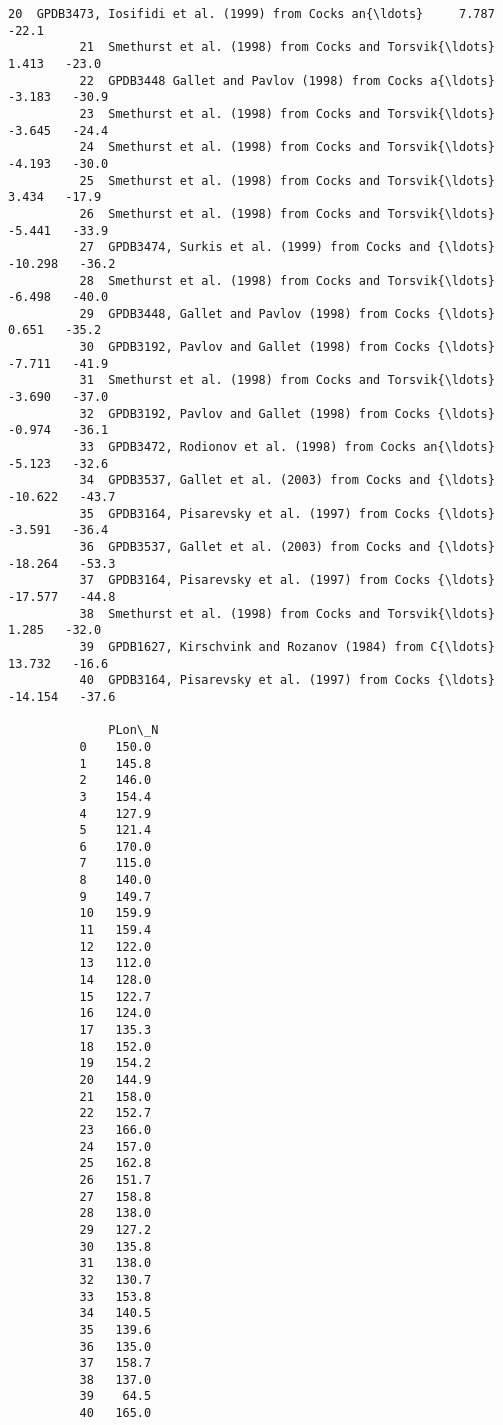 \documentclass[11pt]{article}
\begin{document}
\begin{Verbatim}[commandchars=\\\{\}]
          20  GPDB3473, Iosifidi et al. (1999) from Cocks an{\ldots}     7.787   -22.1   
          21  Smethurst et al. (1998) from Cocks and Torsvik{\ldots}     1.413   -23.0   
          22  GPDB3448 Gallet and Pavlov (1998) from Cocks a{\ldots}    -3.183   -30.9   
          23  Smethurst et al. (1998) from Cocks and Torsvik{\ldots}    -3.645   -24.4   
          24  Smethurst et al. (1998) from Cocks and Torsvik{\ldots}    -4.193   -30.0   
          25  Smethurst et al. (1998) from Cocks and Torsvik{\ldots}     3.434   -17.9   
          26  Smethurst et al. (1998) from Cocks and Torsvik{\ldots}    -5.441   -33.9   
          27  GPDB3474, Surkis et al. (1999) from Cocks and {\ldots}   -10.298   -36.2   
          28  Smethurst et al. (1998) from Cocks and Torsvik{\ldots}    -6.498   -40.0   
          29  GPDB3448, Gallet and Pavlov (1998) from Cocks {\ldots}     0.651   -35.2   
          30  GPDB3192, Pavlov and Gallet (1998) from Cocks {\ldots}    -7.711   -41.9   
          31  Smethurst et al. (1998) from Cocks and Torsvik{\ldots}    -3.690   -37.0   
          32  GPDB3192, Pavlov and Gallet (1998) from Cocks {\ldots}    -0.974   -36.1   
          33  GPDB3472, Rodionov et al. (1998) from Cocks an{\ldots}    -5.123   -32.6   
          34  GPDB3537, Gallet et al. (2003) from Cocks and {\ldots}   -10.622   -43.7   
          35  GPDB3164, Pisarevsky et al. (1997) from Cocks {\ldots}    -3.591   -36.4   
          36  GPDB3537, Gallet et al. (2003) from Cocks and {\ldots}   -18.264   -53.3   
          37  GPDB3164, Pisarevsky et al. (1997) from Cocks {\ldots}   -17.577   -44.8   
          38  Smethurst et al. (1998) from Cocks and Torsvik{\ldots}     1.285   -32.0   
          39  GPDB1627, Kirschvink and Rozanov (1984) from C{\ldots}    13.732   -16.6   
          40  GPDB3164, Pisarevsky et al. (1997) from Cocks {\ldots}   -14.154   -37.6   
          
              PLon\_N  
          0    150.0  
          1    145.8  
          2    146.0  
          3    154.4  
          4    127.9  
          5    121.4  
          6    170.0  
          7    115.0  
          8    140.0  
          9    149.7  
          10   159.9  
          11   159.4  
          12   122.0  
          13   112.0  
          14   128.0  
          15   122.7  
          16   124.0  
          17   135.3  
          18   152.0  
          19   154.2  
          20   144.9  
          21   158.0  
          22   152.7  
          23   166.0  
          24   157.0  
          25   162.8  
          26   151.7  
          27   158.8  
          28   138.0  
          29   127.2  
          30   135.8  
          31   138.0  
          32   130.7  
          33   153.8  
          34   140.5  
          35   139.6  
          36   135.0  
          37   158.7  
          38   137.0  
          39    64.5  
          40   165.0  
\end{Verbatim}
        
\end{document}
